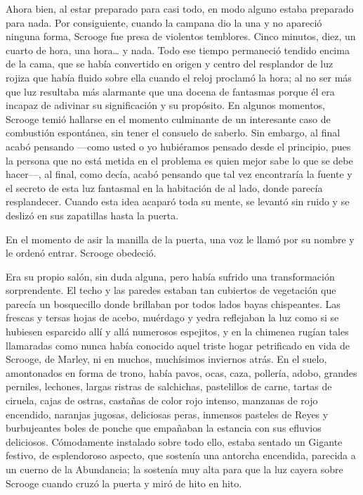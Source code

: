 \documentclass{novela}
\begin{document}
 Ahora bien, al estar preparado para casi todo, en modo alguno estaba preparado para nada. Por consiguiente, cuando la campana dio la una y no apareció ninguna forma, Scrooge fue presa de violentos temblores. Cinco minutos, diez, un cuarto de hora, una hora{\ldots} y nada. Todo ese tiempo permaneció tendido encima de la cama, que se había convertido en origen y centro del resplandor de luz rojiza que había fluido sobre ella cuando el reloj proclamó la hora; al no ser más que luz resultaba más alarmante que una docena de fantasmas porque él era incapaz de adivinar su significación y su propósito. En algunos momentos, Scrooge temió hallarse en el momento culminante de un interesante caso de combustión espontánea, sin tener el consuelo de saberlo. Sin embargo, al final acabó pensando ---como usted o yo hubiéramos pensado desde el principio, pues la persona que no está metida en el problema es quien mejor sabe lo que se debe hacer---, al final, como decía, acabó pensando que tal vez encontraría la fuente y el secreto de esta luz fantasmal en la habitación de al lado, donde parecía resplandecer. Cuando esta idea acaparó toda su mente, se levantó sin ruido y se deslizó en sus zapatillas hasta la puerta.

 En el momento de asir la manilla de la puerta, una voz le llamó por su nombre y le ordenó entrar. Scrooge obedeció.

 Era su propio salón, sin duda alguna, pero había sufrido una transformación sorprendente. El techo y las paredes estaban tan cubiertos de vegetación que parecía un bosquecillo donde brillaban por todos lados bayas chispeantes. Las frescas y tersas hojas de acebo, muérdago y yedra reflejaban la luz como si se hubiesen esparcido allí y allá numerosos espejitos, y en la chimenea rugían tales llamaradas como nunca había conocido aquel triste hogar petrificado en vida de Scrooge, de Marley, ni en muchos, muchísimos inviernos atrás. En el suelo, amontonados en forma de trono, había pavos, ocas, caza, pollería, adobo, grandes perniles, lechones, largas ristras de salchichas, pastelillos de carne, tartas de ciruela, cajas de ostras, castañas de color rojo intenso, manzanas de rojo encendido, naranjas jugosas, deliciosas peras, inmensos pasteles de Reyes y burbujeantes boles de ponche que empañaban la estancia con sus efluvios deliciosos. Cómodamente instalado sobre todo ello, estaba sentado un Gigante festivo, de esplendoroso aspecto, que sostenía una antorcha encendida, parecida a un cuerno de la Abundancia; la sostenía muy alta para que la luz cayera sobre Scrooge cuando cruzó la puerta y miró de hito en hito.
\end{document}
